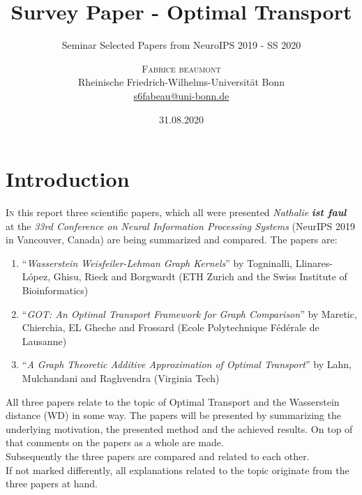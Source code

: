 \documentclass[twoside,twocolumn]{scrartcl}
\title{Survey Paper - Optimal Transport}
\subtitle{Seminar Selected Papers from NeuroIPS 2019 - SS 2020}
\author{\textsc{Fabrice beaumont} \\[1ex] 
	\normalsize Rheinische Friedrich-Wilhelms-Universit\"at Bonn\\
	\normalsize \href{mailto:s6fabeau@uni-bonn.de}{s6fabeau@uni-bonn.de}  
}
\date{31.08.2020}
\begin{document}
\maketitle



\section{Introduction}

\lettrine[nindent=0em,lines=2]{I} n this report three scientific papers, which all were presented \textit{Nathalie} \textit{\textbf{ist faul}} at the \textit{33rd Conference on Neural Information Processing Systems} (NeurIPS 2019 in Vancouver, Canada) are being summarized and compared. The papers are:\begin{enumerate}
	\item \enquote{\textit{Wasserstein Weisfeiler-Lehman Graph Kernels}} by Togninalli, Llinares-López, Ghisu, Rieck and Borgwardt (ETH Zurich and the Swiss Institute of Bioinformatics) \cite{A}
	\item \enquote{\textit{GOT: An Optimal Transport Framework for Graph Comparison}} by 
	 Maretic, Chierchia, EL Gheche and Frossard (Ecole Polytechnique Fédérale de Lausanne) \cite{B}
	\item \enquote{\textit{A Graph Theoretic Additive Approximation of Optimal Transport}}
	by Lahn, Mulchandani and Raghvendra (Virginia Tech)
	\cite{C}
\end{enumerate}

All three papers relate to the topic of Optimal Transport and the Wasserstein distance (WD) in some way. The papers will be presented by summarizing the underlying motivation, the presented method and the achieved results. On top of that comments on the papers as a whole are made.\\
Subsequently the three papers are compared and related to each other.\\
If not marked differently, all explanations related to the topic originate from the three papers at hand.\\
\end{document}
